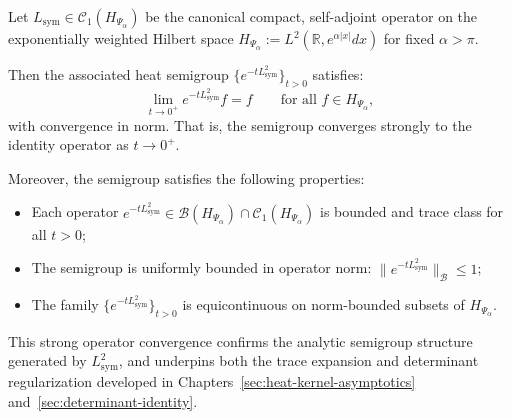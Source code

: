 \begin{proposition}
\label{prop:strong_op_closure_heat}
Let \( L_{\mathrm{sym}} \in \mathcal{C}_1(H_{\Psi_\alpha}) \) be the canonical compact, self-adjoint operator on the exponentially weighted Hilbert space \( H_{\Psi_\alpha} := L^2(\mathbb{R}, e^{\alpha |x|} dx) \) for fixed \( \alpha > \pi \).

Then the associated heat semigroup \( \{ e^{-t L_{\mathrm{sym}}^2} \}_{t > 0} \) satisfies:
\[
\lim_{t \to 0^+} e^{-t L_{\mathrm{sym}}^2} f = f \qquad \text{for all } f \in H_{\Psi_\alpha},
\]
with convergence in norm. That is, the semigroup converges strongly to the identity operator as \( t \to 0^+ \).

\medskip
\noindent
Moreover, the semigroup satisfies the following properties:
\begin{itemize}
    \item Each operator \( e^{-t L_{\mathrm{sym}}^2} \in \mathcal{B}(H_{\Psi_\alpha}) \cap \mathcal{C}_1(H_{\Psi_\alpha}) \) is bounded and trace class for all \( t > 0 \);
    \item The semigroup is uniformly bounded in operator norm: \( \| e^{-t L_{\mathrm{sym}}^2} \|_{\mathcal{B}} \le 1 \);
    \item The family \( \{ e^{-t L_{\mathrm{sym}}^2} \}_{t > 0} \) is equicontinuous on norm-bounded subsets of \( H_{\Psi_\alpha} \).
\end{itemize}

\medskip
\noindent
This strong operator convergence confirms the analytic semigroup structure generated by \( L_{\mathrm{sym}}^2 \), and underpins both the trace expansion and determinant regularization developed in Chapters~\ref{sec:heat-kernel-asymptotics} and~\ref{sec:determinant-identity}.
\end{proposition}
